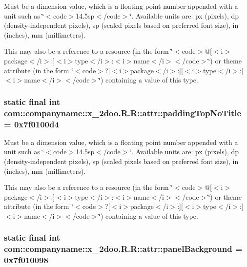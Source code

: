 Must be a dimension value, which is a floating point number appended with a unit such as \char`\"{}$<$code$>$14.5sp$<$/code$>$\char`\"{}. Available units are: px (pixels), dp (density-independent pixels), sp (scaled pixels based on preferred font size), in (inches), mm (millimeters). 

This may also be a reference to a resource (in the form \char`\"{}$<$code$>$@\mbox{[}$<$i$>$package$<$/i$>$:\mbox{]}$<$i$>$type$<$/i$>$:$<$i$>$name$<$/i$>$$<$/code$>$\char`\"{}) or theme attribute (in the form \char`\"{}$<$code$>$?\mbox{[}$<$i$>$package$<$/i$>$:\mbox{]}\mbox{[}$<$i$>$type$<$/i$>$:\mbox{]}$<$i$>$name$<$/i$>$$<$/code$>$\char`\"{}) containing a value of this type. \hypertarget{classcom_1_1companyname_1_1x__2doo_1_1_r_1_1attr_5cf782c12557be2430e7d3e353219950}{
\subsubsection[{paddingTopNoTitle}]{\setlength{\rightskip}{0pt plus 5cm}static final int com::companyname::x\_\-2doo.R.R::attr::paddingTopNoTitle = 0x7f0100d4}}
\label{classcom_1_1companyname_1_1x__2doo_1_1_r_1_1attr_5cf782c12557be2430e7d3e353219950}


Must be a dimension value, which is a floating point number appended with a unit such as \char`\"{}$<$code$>$14.5sp$<$/code$>$\char`\"{}. Available units are: px (pixels), dp (density-independent pixels), sp (scaled pixels based on preferred font size), in (inches), mm (millimeters). 

This may also be a reference to a resource (in the form \char`\"{}$<$code$>$@\mbox{[}$<$i$>$package$<$/i$>$:\mbox{]}$<$i$>$type$<$/i$>$:$<$i$>$name$<$/i$>$$<$/code$>$\char`\"{}) or theme attribute (in the form \char`\"{}$<$code$>$?\mbox{[}$<$i$>$package$<$/i$>$:\mbox{]}\mbox{[}$<$i$>$type$<$/i$>$:\mbox{]}$<$i$>$name$<$/i$>$$<$/code$>$\char`\"{}) containing a value of this type. \hypertarget{classcom_1_1companyname_1_1x__2doo_1_1_r_1_1attr_3f6cca6bcd0ecb6b741a38525056545b}{
\subsubsection[{panelBackground}]{\setlength{\rightskip}{0pt plus 5cm}static final int com::companyname::x\_\-2doo.R.R::attr::panelBackground = 0x7f010098}}
\label{classcom_1_1companyname_1_1x__2doo_1_1_r_1_1attr_3f6cca6bcd0ecb6b741a38525056545b}



